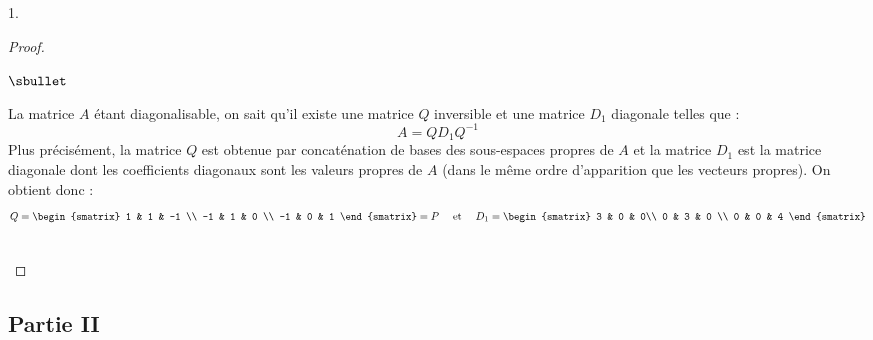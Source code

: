 \documentclass[11pt]{article}%
\begin{document}
\begin{noliste}{1.}
\begin{proof}
\begin{noliste}{$\sbullet$}
    \item La matrice $A$ étant diagonalisable, on sait qu'il existe
      une matrice $Q$ inversible et une matrice $D_1$ diagonale telles
      que :
      \[
      A = Q D_1 Q^{-1}
      \]
      Plus précisément, la matrice $Q$ est obtenue par concaténation
      de bases des sous-espaces propres de $A$ et la matrice $D_1$ est
      la matrice diagonale dont les coefficients diagonaux sont les
      valeurs propres de $A$ (dans le même ordre d'apparition que les
      vecteurs propres). On obtient donc : 
      \[
      Q =
      \begin{smatrix}
        1 & 1 & -1 \\
        -1 & 1 & 0 \\
        -1 & 0 & 1
      \end{smatrix}
      = P
      \quad \text{ et } \quad %
      D_1 = 
      \begin{smatrix}
        3 & 0 & 0\\
        0 & 3 & 0 \\
        0 & 0 & 4
      \end{smatrix}
      \]      
    \end{noliste}
    ~\\[-1cm]
  \end{proof}
\end{noliste}

\subsection*{Partie II} 
\end{document}
